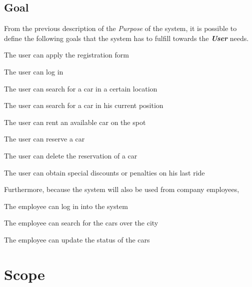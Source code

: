 \documentclass[11pt,a4paper]{report}
\begin{document}
\subsection{Goal}
From the previous description of the \textit{Purpose} of the system, it is possible to define the following goals that the system has to fulfill towards the \textit{\textbf{User}} needs.
\begin{Goal}
\item {} {The user can apply the registration form}
\item {} {The user can log in}
\item {} {The user can search for a car in a certain location}
\item {} {The user can search for a car in his current position}
\item {} {The user can rent an available car on the spot}
\item {} {The user can reserve a car}
\item {} {The user can delete the reservation of a car}
\item {} {The user can obtain special discounts or penalties on his last ride}
\end{Goal}
Furthermore, because the system will also be used from company employees, 
\begin{Goal}[resume]
\item {} The employee can log in into the system
\item {} The employee can search for the cars over the city
\item {} The employee can update the status of the cars
\end{Goal}

\section{Scope}
\end{document}
